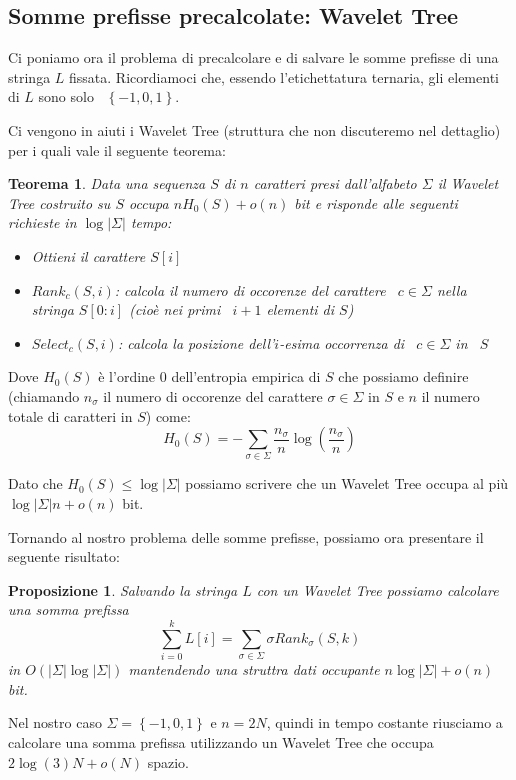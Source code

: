 \documentclass[a4paper,10pt]{amsbook}
\newcounter{counter1}
\theoremstyle{plain}
\newtheorem{myteo}[counter1]{Teorema}
\newtheorem{mypro}[counter1]{Proposizione}
\theoremstyle{definition}
\theoremstyle{remark}
\newcommand{\set}[1]{\left\{#1\right\}}
\newcommand{\pa}[1]{\left(#1\right)}
\newcommand{\abs}[1]{\left|#1\right|}
\begin{document}
\subsection{Somme prefisse precalcolate: Wavelet Tree}

Ci poniamo ora il problema di precalcolare e di salvare le somme
prefisse di una stringa $L$ fissata. Ricordiamoci che, essendo
l'etichettatura ternaria, gli elementi di $L$ sono solo~ $\set{-1, 0,
  1}$.

Ci vengono in aiuti i Wavelet Tree (struttura che non discuteremo nel
dettaglio) per i quali vale il seguente teorema:
\begin{myteo}
  Data una sequenza $S$ di $n$ caratteri presi dall'alfabeto $\Sigma$
  il Wavelet Tree costruito su $S$ occupa $nH_0(S) + o(n)$ bit e
  risponde alle seguenti richieste in $\log \abs{\Sigma}$ tempo:
  \begin{itemize}
  \item Ottieni il carattere $S[i]$
  \item $Rank_c (S,i)$: calcola il numero di occorenze del carattere~
    $c\in \Sigma$ nella stringa $S[0:i]$ (cio\`e nei primi~ $i+1$
    elementi di $S$)
  \item $Select _c (S,i)$: calcola la posizione dell'$i$-esima
    occorrenza di~ $c\in \Sigma$ in~ $S$
  \end{itemize}
\end{myteo}

Dove $H_0(S)$ \`e l'ordine $0$ dell'entropia empirica di $S$ che
possiamo definire (chiamando $n_\sigma$ il numero di occorenze del
carattere $\sigma\in \Sigma$ in $S$ e $n$ il numero totale di
caratteri in $S$) come:
\[ H_0(S) = - \sum _{\sigma \in \Sigma} \frac{n_\sigma}{n} \log \pa{
  \frac{n_\sigma}{n}} \] 

Dato che $H_0(S) \le \log \abs{\Sigma}$ possiamo scrivere che un
Wavelet Tree occupa al pi\`u $\log \abs{\Sigma} n + o(n)$ bit.

Tornando al nostro problema delle somme prefisse, possiamo ora
presentare il seguente risultato:
\begin{mypro}
  Salvando la stringa $L$ con un Wavelet Tree possiamo calcolare una
  somma prefissa
  \[ \sum _{i=0} ^ {k} L[i] = \sum _{\sigma \in \Sigma} \sigma Rank
  _\sigma (S,k) \] 
  in $O\pa{ \abs{\Sigma} \log \abs{\Sigma} }$ mantendendo una struttra
  dati occupante $n\log \abs{\Sigma} + o(n)$ bit.
\end{mypro}

Nel nostro caso $\Sigma = \set{ -1,0,1}$ e $n = 2N$, quindi in tempo
costante riusciamo a calcolare una somma prefissa utilizzando un
Wavelet Tree che occupa $2\log\pa{ 3} N + o(N)$ spazio.
\end{document}
